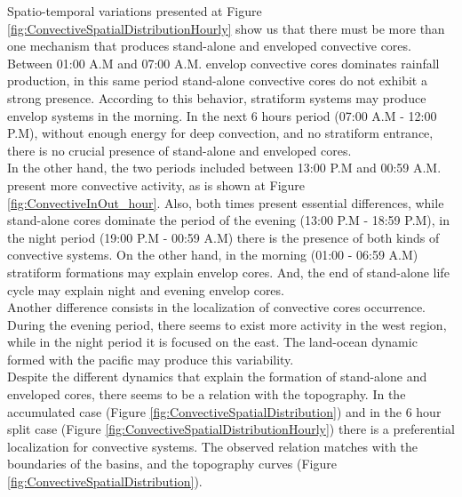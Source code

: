 \documentclass[preprint,12pt]{elsarticle}
\begin{document}
Spatio-temporal variations presented at Figure \ref{fig:ConvectiveSpatialDistributionHourly} show us that there must be more than one mechanism that produces stand-alone and enveloped convective cores.  Between 01:00 A.M and 07:00 A.M. envelop convective cores dominates rainfall production, in this same period stand-alone convective cores do not exhibit a strong presence.  According to this behavior, stratiform systems may produce envelop systems in the morning.  In the next 6 hours period (07:00 A.M - 12:00 P.M), without enough energy for deep convection, and no stratiform entrance, there is no crucial presence of stand-alone and enveloped cores.\\ 

In the other hand, the two periods included between 13:00 P.M and 00:59 A.M. present more convective activity, as is shown at Figure \ref{fig:ConvectiveInOut_hour}. Also, both times present essential differences, while stand-alone cores dominate the period of the evening (13:00 P.M - 18:59 P.M), in the night period (19:00 P.M - 00:59 A.M) there is the presence of both kinds of convective systems.  On the other hand, in the morning (01:00 - 06:59 A.M) stratiform formations may explain envelop cores.  And, the end of stand-alone life cycle may explain night and evening envelop cores.\\

Another difference consists in the localization of convective cores occurrence. During the evening period, there seems to exist more activity in the west region, while in the night period it is focused on the east.  The land-ocean dynamic formed with the pacific \citep{Poveda2004} may produce this variability.\\

Despite the different dynamics that explain the formation of stand-alone and enveloped cores, there seems to be a relation with the topography.  In the accumulated case (Figure \ref{fig:ConvectiveSpatialDistribution}) and in the 6 hour split case (Figure \ref{fig:ConvectiveSpatialDistributionHourly}) there is a preferential localization for convective systems.  The observed relation matches with the boundaries of the basins, and the topography curves (Figure \ref{fig:ConvectiveSpatialDistribution}).\\
\end{document}
